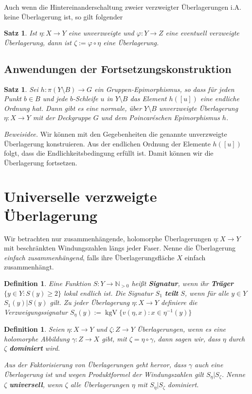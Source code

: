 \documentclass[12pt,a4paper]{article}
\theoremstyle{plain}
\newtheorem{Satz}[Theorem]{Satz}
\newtheorem{Definition}[Theorem]{Definition}
\newcommand{\herv}[1]{{\emph{\textbf{#1}}}}
\newcommand{\N}{\mathbb{N}}
\numberwithin{equation}{section}
\begin{document}
Auch wenn die Hintereinanderschaltung zweier verzweigter Überlagerungen i.A. keine Über\-la\-ge\-rung ist, so gilt folgender
\begin{Satz} Ist $\eta: X\rightarrow Y$ eine unverzweigte und $\varphi: Y\rightarrow Z$ eine eventuell verzweigte Überlagerung, dann ist $\zeta:=\varphi\circ \eta$ eine Überlagerung.
\end{Satz}
\subsection{Anwendungen der Fortsetzungskonstruktion}
\begin{Satz} Sei $h : \pi(Y \setminus B)\rightarrow G$ ein Gruppen-Epimorphismus, so dass für jeden Punkt $b\in B$ und jede $b$-Schleife $u$ in $Y\setminus B$ das Element $h([u])$ eine endliche Ordnung hat. Dann gibt es eine normale, über $Y\setminus B$ unverzweigte Überlagerung $\eta : X \rightarrow Y $ mit der Deckgruppe $G$ und dem Poincar\'{e}schen Epimorphismus $h$.
\end{Satz}
\textit{Beweisidee.} Wir können mit den Gegebenheiten die genannte unverzweigte Überlagerung konstruieren. Aus der endlichen Ordnung der Elemente $h([u])$ folgt, dass die Endlichkeitsbedingung erfüllt ist. Damit können wir die Überlagerung fortsetzen.
\section{Universelle verzweigte Überlagerung}
Wir betrachten nur zusammenhängende, holomorphe Überlagerungen $\eta:X\rightarrow Y$ mit beschränkten Windungszahlen längs jeder Faser. Nenne die Überlagerung \emph{einfach zusammenhängend}, falls ihre Überlagerungsfläche $X$ einfach zusammenhängt.
\begin{Definition} Eine Funktion $S:Y\rightarrow \N_{>0}$ heißt \herv{Signatur}, wenn ihr \herv{Träger} $\{y\in Y: S(y) \geq 2 \}$ lokal endlich ist. Die Signatur $S_1$ \herv{teilt} $S$, wenn  für alle $y\in Y$ $S_1(y)|S(y)$ gilt. Zu jeder Überlagerung $\eta:X\rightarrow Y$ definiere die Verzweigungssignatur $S_\eta(y):=\operatorname{kgV}\{v(\eta,x) : x \in \eta^{-1}(y)\}$
\end{Definition}
\begin{Definition} Seien $\eta:X\rightarrow Y$ und $\zeta: Z\rightarrow Y$ Überlagerungen, wenn es eine holomorphe Abbildung $\gamma: Z\rightarrow X$ gibt, mit $\zeta = \eta \circ \gamma$, dann sagen wir, dass $\eta$ durch $\zeta$ \herv{dominiert} wird. 

Aus der Faktorisierung von Überlagerungen geht hervor, dass $\gamma$ auch eine Überlagerung ist und wegen Produktformel der Windungszahlen gilt $S_\eta | S_\zeta$. Nenne $\zeta$ \herv{universell}, wenn $\zeta$ alle Überlagerungen $\eta$ mit $S_\eta | S_\zeta$ dominiert.
\end{Definition}
\end{document}
